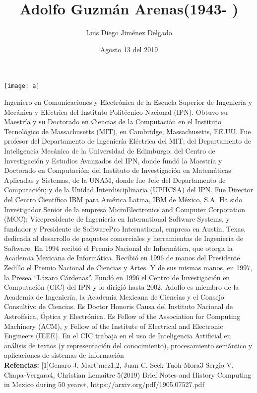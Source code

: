 \documentclass[12pt]{article}
\title{Adolfo Guzmán Arenas(1943- )}
\author{Luis Diego Jiménez Delgado}
\date{Agosto 13 del 2019}
\begin{document}
\maketitle

\begin{center}
    
\texttt{[image: a]}
\end{center}
Ingeniero en Comunicaciones y Electrónica de la Escuela Superior de Ingeniería y Mecánica y Eléctrica del Instituto Politécnico Nacional (IPN).
 Obtuvo su Maestría y su Doctorado en Ciencias de la Computación en el Instituto Tecnológico de Massachusetts (MIT), en Cambridge, Massachusetts, EE.UU. 
 Fue profesor del Departamento de Ingeniería Eléctrica del MIT; del Departamento de Inteligencia Mecánica de la Universidad de Edimburgo; del Centro de Investigación y Estudios Avanzados del IPN, donde fundó la Maestría 
 y Doctorado en Computación; del Instituto de Investigación en Matemáticas Aplicadas y Sistemas, de la UNAM, donde fue Jefe del Departamento de Computación; y de la Unidad Interdisciplinaria (UPIICSA) del IPN. Fue Director del Centro 
 Científico IBM para América Latina, IBM de México, S.A. Ha sido 
 Investigador Senior de la empresa MicroElectronics and Computer Corporation (MCC); Vicepresidente de Ingeniería en International Software Systems, y 
 fundador y Presidente de SoftwarePro International, empresa en Austin, Texas, dedicada al desarrollo de paquetes comerciales y herramientas de Ingeniería de Software. En 1994 recibió el Premio Nacional de 
 Informática, que otorga la Academia Mexicana de Informática. Recibió en 1996 de manos del Presidente Zedillo el Premio Nacional de Ciencias y Artes. Y de sus mismas manos, en 1997, la Presea “Lázaro Cárdenas”.
Fundó en 1996 el Centro de Investigación en Computación (CIC) del IPN y lo dirigió hasta 2002. Adolfo es miembro de la Academia de Ingeniería, la Academia Mexicana de Ciencias y el Consejo Consultivo de Ciencias. Es Doctor Honoris Causa del Instituto Nacional de Astrofísica, Óptica y Electrónica. Es Fellow of the Association for Computing Machinery (ACM), y Fellow of the Institute of Electrical and Electronic Engineers (IEEE). En el CIC trabaja en el uso de Inteligencia Artificial en análisis de textos (y representación del conocimiento), procesamiento semántico y aplicaciones de sistemas de información
\\
\textbf{Refencias:}
[1]Genaro J. Mart ́ınez1,2, Juan C. Seck-Tuoh-Mora3 Sergio V. Chapa-Vergara4, Christian Lemaitre 5(2019) Brief Notes and History Computing in Mexico during 50 years∗, https://arxiv.org/pdf/1905.07527.pdf
\end{document}
